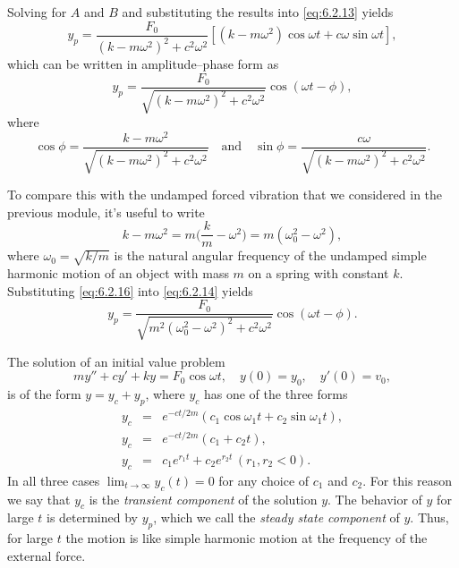 \documentclass{ximera}
\begin{document}
 
 Solving  for $A$ and $B$
and substituting the results into  \eqref{eq:6.2.13} yields
$$
y_p=\frac{F_0}{(k-m\omega^2)^2+c^2\omega^2}
\left[(k-m\omega^2)\cos\omega t+c\omega\sin\omega t\right],
$$
which can be written in amplitude--phase form  as
\begin{equation}\label{eq:6.2.14} %
y_p=\frac{F_0}{\sqrt{(k-m\omega^2)^2+c^2\omega^2}}
\cos(\omega t-\phi),
\end{equation}
where
\begin{equation}\label{eq:6.2.15}
\cos\phi=\frac{k-m\omega^2}{\sqrt
{(k-m\omega^2)^2+c^2\omega^2}}\quad\mbox{and}\quad
\sin\phi=\frac{c\omega}{\sqrt{(k-m\omega^2)^2+c^2\omega^2}}.
\end{equation}
 
  To compare this with the undamped forced vibration
that we considered in the previous module, it's useful to write
\begin{equation}\label{eq:6.2.16}
k-m\omega^2=m\bigg(\frac{k}{m}-\omega^2\bigg)=
m(\omega_0^2-\omega^2),
\end{equation}
 where $\omega_0=\sqrt{k/m}$ is the natural
angular frequency of the undamped simple harmonic motion of an
object with mass $m$ on a spring with constant $k$.
Substituting  \eqref{eq:6.2.16} into  \eqref{eq:6.2.14} yields
\begin{equation}\label{eq:6.2.17}
y_p=\frac{F_0}{\sqrt{m^2(\omega^2_0-\omega^2)^2+
c^2\omega^2}}\cos(\omega t-\phi).
\end{equation}
 
The solution of an initial value problem
$$
my''+cy'+ky=F_0\cos\omega t, \quad  y(0)=y_0,\quad y'(0)=v_0,
$$
is of the form $y=y_c+y_p$,
where  $y_c$ has one of the three forms
\begin{eqnarray*}
y_c&=&e^{-ct/2m}(c_1\cos\omega_1t+c_2\sin\omega_1t),\\
 y_c&=&e^{-ct/2m}(c_1+c_2t),\\
y_c&=&c_1e^{r_1t}+c_2e^{r_2t}\,(r_1,r_2<0).
\end{eqnarray*}
In all three cases $\lim_{t\rightarrow\infty} y_c(t)=0$ for any choice of
$c_1$ and $c_2$. For this reason we say that $y_c$ is the \textit{transient component} of the solution $y$. The behavior of $y$ for
large $t$ is determined by $y_p$, which we call the \textit{steady state
component} of $y$. Thus, for large $t$ the motion is like simple
harmonic motion at the frequency of the external force.
 
\end{document}
